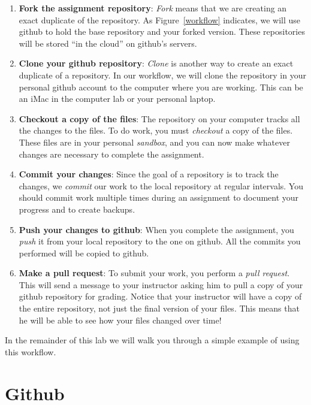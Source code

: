 \documentclass[11pt]{article}
\begin{document}
\begin{enumerate}
\item {\bf Fork the assignment repository}:  {\em Fork} means that we are creating an exact duplicate of the repository.  As Figure~\ref{workflow} indicates, we will use github to hold the base repository and your forked version.  These repositories will be stored ``in the cloud'' on github's servers.

\item {\bf Clone your github repository}:  {\em Clone} is another way to create an exact duplicate of a repository.  In our workflow, we will clone the repository in your personal github account to the computer where you are working.  This can be an iMac in the computer lab or your personal laptop.

\item {\bf Checkout a copy of the files}:  The repository on your computer tracks all the changes to the files.  To do work, you must {\em checkout} a copy of the files.  These files are in your personal {\em sandbox}, and you can now make whatever changes are necessary to complete the assignment.

\item {\bf Commit your changes}:  Since the goal of a repository is to track the changes, we {\em commit} our work to the local repository at regular intervals.  You should commit work multiple times during an assignment to document your progress and to create backups.

\item {\bf Push your changes to github}:  When you complete the assignment, you {\em push} it from your local repository to the one on github.  All the commits you performed will be copied to github.

\item {\bf Make a pull request}:  To submit your work, you perform a {\em pull request}.  This will send a message to your instructor asking him to pull a copy of your github repository for grading.  Notice that your instructor will have a copy of the entire repository, not just the final version of your files.  This means that he will be able to see how your files changed over time!
\end{enumerate}

In the remainder of this lab we will walk you through a simple example of using this workflow.

\section*{Github}
\end{document}
